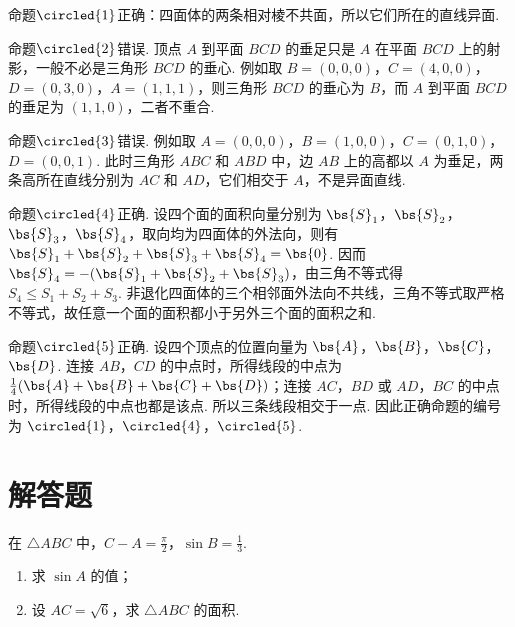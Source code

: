 \begin{solution}
命题\(\circled{1}\)正确：四面体的两条相对棱不共面，所以它们所在的直线异面.

命题\(\circled{2}\)错误. 顶点 \(A\) 到平面 \(BCD\) 的垂足只是 \(A\) 在平面 \(BCD\) 上的射影，一般不必是三角形 \(BCD\) 的垂心. 例如取 \(B=(0,0,0)\)，\(C=(4,0,0)\)，\(D=(0,3,0)\)，\(A=(1,1,1)\)，则三角形 \(BCD\) 的垂心为 \(B\)，而 \(A\) 到平面 \(BCD\) 的垂足为 \((1,1,0)\)，二者不重合.

命题\(\circled{3}\)错误. 例如取 \(A=(0,0,0)\)，\(B=(1,0,0)\)，\(C=(0,1,0)\)，\(D=(0,0,1)\). 此时三角形 \(ABC\) 和 \(ABD\) 中，边 \(AB\) 上的高都以 \(A\) 为垂足，两条高所在直线分别为 \(AC\) 和 \(AD\)，它们相交于 \(A\)，不是异面直线.

命题\(\circled{4}\)正确. 设四个面的面积向量分别为 \(\bs{S}_1\)，\(\bs{S}_2\)，\(\bs{S}_3\)，\(\bs{S}_4\)，取向均为四面体的外法向，则有 \(\bs{S}_1+\bs{S}_2+\bs{S}_3+\bs{S}_4=\bs{0}\). 因而 \(\bs{S}_4=-(\bs{S}_1+\bs{S}_2+\bs{S}_3)\)，由三角不等式得 \(S_4\leqslant S_1+S_2+S_3\). 非退化四面体的三个相邻面外法向不共线，三角不等式取严格不等式，故任意一个面的面积都小于另外三个面的面积之和.

命题\(\circled{5}\)正确. 设四个顶点的位置向量为 \(\bs{A}\)，\(\bs{B}\)，\(\bs{C}\)，\(\bs{D}\). 连接 \(AB\)，\(CD\) 的中点时，所得线段的中点为 \(\frac{1}{4}(\bs{A}+\bs{B}+\bs{C}+\bs{D})\)；连接 \(AC\)，\(BD\) 或 \(AD\)，\(BC\) 的中点时，所得线段的中点也都是该点. 所以三条线段相交于一点. 因此正确命题的编号为 \(\circled{1}\)，\(\circled{4}\)，\(\circled{5}\).
\end{solution}

\section{解答题}

\begin{problem}
在 \(\triangle ABC\) 中，\(C - A = \frac{\pi}{2}\)，\(\sin B = \frac{1}{3}\).
\begin{enumerate}
\item 求 \( \sin A \) 的值；
\item 设 \( AC = \sqrt{6} \)，求 \( \triangle ABC \) 的面积.
\end{enumerate}
\end{problem}

